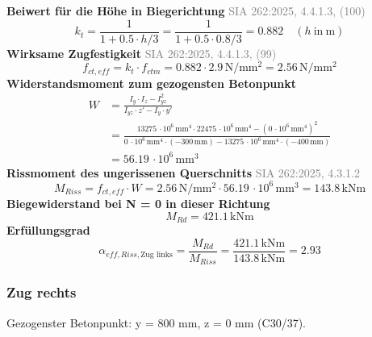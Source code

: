 \documentclass[11pt,a4paper]{article}
\newcommand{\normref}[1]{{\small\textcolor{gray}{#1}}}
\begin{document}
\noindent\textbf{Beiwert für die Höhe in Biegerichtung} \hfill \normref{SIA 262:2025, 4.4.1.3, (100)}
\begin{equation*}
k_t = \frac{1}{1 + 0.5 \cdot h/3} = \frac{1}{1 + 0.5 \cdot 0.8/3} = 0.882 \quad \left(h\ \text{in}\ \mathrm{m}\right)
\end{equation*}
\noindent\textbf{Wirksame Zugfestigkeit} \hfill \normref{SIA 262:2025, 4.4.1.3, (99)}
\begin{equation*}
f_{ct,eff} = k_t \cdot f_{ctm} = 0.882 \cdot 2.9\,\mathrm{N}/\mathrm{mm}^{2} = 2.56\,\mathrm{N}/\mathrm{mm}^{2}
\end{equation*}
\noindent\textbf{Widerstandsmoment zum gezogensten Betonpunkt}
\begin{equation*}
\begin{aligned}
  W &= \frac{I_y \cdot I_z - I_{yz}^{2}}{I_{yz} \cdot z' - I_y \cdot y'} \\
  &= \frac{13275\,\cdot 10^{6}\,\mathrm{mm}^{4} \cdot 22475\,\cdot 10^{6}\,\mathrm{mm}^{4} - \left(0\,\cdot 10^{6}\,\mathrm{mm}^{4}\right)^{2}}{0\,\cdot 10^{6}\,\mathrm{mm}^{4} \cdot \left(-300\,\mathrm{mm}\right) - 13275\,\cdot 10^{6}\,\mathrm{mm}^{4} \cdot \left(-400\,\mathrm{mm}\right)} \\
  &= 56.19\,\cdot 10^{6}\,\mathrm{mm}^{3}
\end{aligned}
\end{equation*}
\noindent\textbf{Rissmoment des ungerissenen Querschnitts} \hfill \normref{SIA 262:2025, 4.3.1.2}
\begin{equation*}
M_{Riss} = f_{ct,eff} \cdot W = 2.56\,\mathrm{N}/\mathrm{mm}^{2} \cdot 56.19\,\cdot 10^{6}\,\mathrm{mm}^{3} = 143.8\,\mathrm{kNm}
\end{equation*}
\noindent\textbf{Biegewiderstand bei N = 0 in dieser Richtung}
\begin{equation*}
M_{Rd} = 421.1\,\mathrm{kNm}
\end{equation*}
\noindent\textbf{Erfüllungsgrad}
\begin{equation*}
\alpha_{eff,Riss,\text{Zug links}} = \frac{M_{Rd}}{M_{Riss}} = \frac{421.1\,\mathrm{kNm}}{143.8\,\mathrm{kNm}} = 2.93
\end{equation*}
\subsubsection{Zug rechts}
Gezogenster Betonpunkt: y = 800 mm, z = 0 mm (C30/37).
\end{document}
